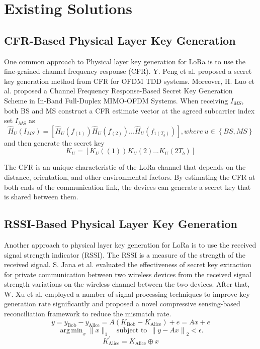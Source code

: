\section{Existing Solutions}
\subsection{CFR-Based Physical Layer Key Generation}
One common approach to Physical layer key generation for LoRa is to use the fine-grained channel frequency response (CFR). Y. Peng et al. proposed a secret key generation method from CFR for OFDM TDD systems\cite{7054386}. Moreover, H. Luo et al. proposed a Channel Frequency Response-Based Secret Key Generation Scheme in In-Band Full-Duplex MIMO-OFDM Systems\cite{10158732}. When receiving \(I_{MS}\), both BS and MS construct a CFR estimate vector at the agreed subcarrier index set \(I_{MS}\) as
\begin{equation} 
  \hat{H}_{U}(I_{MS})   = \left [ \hat{H}_{U}(f_{(1)})\hat{H}_{U}(f_{(2)}) ...\hat{H}_{U}(f_{1(T_{b})}) \right ], where\ u\in \left \{ BS, MS  \right \}   
\end{equation} 
and then generate the secret key
\begin{equation} 
  K_{U}  = \left [ K_{U}({(1)})K_{U}{(2)} ...K_{U}({2T_{b}}) \right ]
\end{equation} 

The CFR is an unique characteristic of the LoRa channel that depends on the distance, orientation, and other environmental factors. By estimating the CFR at both ends of the communication link, the devices can generate a secret key that is shared between them.

\subsection{RSSI-Based Physical Layer Key Generation}
Another approach to physical layer key generation for LoRa is to use the received signal strength indicator (RSSI). The RSSI is a measure of the strength of the received signal. S. Jana et al. evaluated the effectiveness of secret key extraction for private communication between two wireless devices from the received signal strength variations on the wireless channel between the two devices\cite{10.1145/1614320.1614356}. After that, W. Xu et al. employed a number of signal processing techniques to improve key generation rate significantly and proposed a novel compressive sensing-based reconciliation framework to reduce the mismatch rate\cite{8580375}. 
\begin{equation} y = y_{\mathrm{ Bob}}-y_{\mathrm{ Alice}}= A \left ({K_{\mathrm{ Bob}}-K_{\mathrm{ Alice}}}\right) + e= A x +e \end{equation} 
\begin{equation} \mathop {\mathrm {arg\,min}} _{x} \| x \|_{1} \quad \text {subject to}~ ~\left \|{y - Ax}\right \|_{2} < \epsilon.\end{equation} 
\begin{equation}K_{\mathrm{ Alice}}^{'} = K_{\mathrm{ Alice}} \oplus x\end{equation} 


